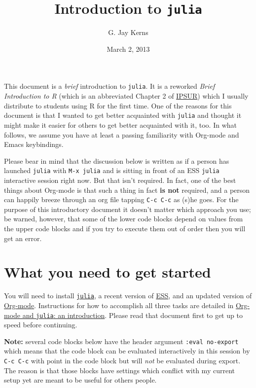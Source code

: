 \documentclass[11pt]{article}
\author{G. Jay Kerns}
\date{March 2, 2013}
\title{Introduction to \texttt{julia}}
\begin{document}
\maketitle
\tableofcontents

\vspace{0.25in}

This document is a \emph{brief} introduction to \texttt{julia}. It is a reworked
\emph{Brief Introduction to R} (which is an abbreviated Chapter 2 of \href{http:ipsur.org}{IPSUR})
which I usually distribute to students using R for the first time.
One of the reasons for this document is that I wanted to get better
acquainted with \texttt{julia} and thought it might make it easier for others
to get better acquainted with it, too. In what follows, we assume you
have at least a passing familiarity with Org-mode and Emacs
keybindings.

Please bear in mind that the discussion below is written as if a
person has launched \texttt{julia} with \texttt{M-x julia} and is sitting in front
of an ESS \texttt{julia} interactive session right now.  But that isn't
required.  In fact, one of the best things about Org-mode is that such
a thing in fact \textbf{is not} required, and a person can happily breeze
through an org file tapping \texttt{C-c C-c} as (s)he goes.  For the purpose
of this introductory document it doesn't matter which approach you
use; be warned, however, that some of the lower code blocks depend on
values from the upper code blocks and if you try to execute them out
of order then you will get an error.

\section[What you need to get started]{What you need to get started}
\label{sec-1}

You will need to install \href{http://julialang.org}{\texttt{julia}}, a recent version of \href{http://ess.r-project.org}{ESS}, and an
updated version of \href{http://orgmode.org}{Org-mode}.  Instructions for how to accomplish all
three tasks are detailed in \href{file://ob-julia-doc.org}{Org-mode and \texttt{julia}: an introduction}.
Please read that document first to get up to speed before continuing.

\textbf{Note:} several code blocks below have the header argument \texttt{:eval
  no-export} which means that the code block can be evaluated
  interactively in this session by \texttt{C-c C-c} with point in the code
  block but will \emph{not} be evaluated during export.  The reason is that
  those blocks have settings which conflict with my current setup yet
  are meant to be useful for others people.
\end{document}
